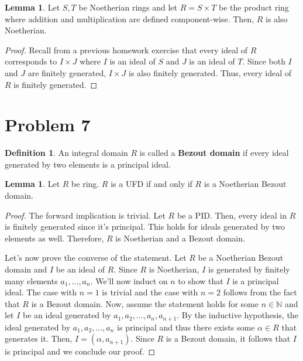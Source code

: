 \documentclass{article}
\theoremstyle{definition}
\newtheorem{definition}{Definition}
\newtheorem{lemma}[theorem]{Lemma}
\begin{document}
\begin{lemma}
    Let $S,T$ be Noetherian rings and let $R = S \times T$ be the product ring where addition and multiplication are defined component-wise. Then, $R$ is also Noetherian.
\end{lemma}
\begin{proof}
    Recall from a previous homework exercise that every ideal of $R$ corresponds to $I \times J$ where $I$ is an ideal of $S$ and $J$ is an ideal of $T$. Since both $I$ and $J$ are finitely generated, $I \times J$ is also finitely generated. Thus, every ideal of $R$ is finitely generated.
\end{proof}

\section{Problem 7}

\begin{definition}
    An integral domain $R$ is called a \textbf{Bezout domain} if every ideal generated by two elements is a principal ideal.
\end{definition}

\begin{lemma}
    Let $R$ be ring. $R$ is a UFD if and only if $R$ is a Noetherian Bezout domain.
\end{lemma}
\begin{proof}
    The forward implication is trivial. Let $R$ be a PID. Then, every ideal in $R$ is finitely generated since it's principal. This holds for ideals generated by two elements as well. Therefore, $R$ is Noetherian and a Bezout domain.

    Let's now prove the converse of the statement. Let $R$ be a Noetherian Bezout domain and $I$ be an ideal of $R$. Since $R$ is Noetherian, $I$ is generated by finitely many elements $a_{1},...,a_{n}$. We'll now induct on $n$ to show that $I$ is a principal ideal. The case with $n = 1$ is trivial and the case with $n = 2$ follows from the fact that $R$ is a Bezout domain. Now, assume the statement holds for some $n \in \mathbb{N}$ and let $I$ be an ideal generated by $a_{1},a_{2},...,a_{n},a_{n+1}$. By the inductive hypothesis, the ideal generated by $a_{1},a_{2},...,a_{n}$ is principal and thus there exists some $\alpha \in R$ that generates it. Then, $I = (\alpha, a_{n+1})$. Since $R$ is a Bezout domain, it follows that $I$ is principal and we conclude our proof.
\end{proof}
\end{document}
